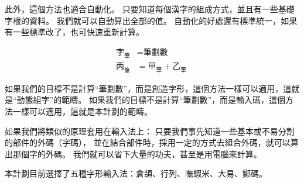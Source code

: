 \documentclass{article}
\newcommand\qhchar[1]{\mbox{#1}}
\newcommand\qhstroke[1]{\qhchar{#1}_{\mbox{筆}}}
\begin{document}
此外，這個方法也適合自動化。
只要知道每個漢字的組成方式，並且有一些基礎字根的資料。
我們就可以自動算出全部的值。
自動化的好處還有標準統一，如果有一些標準改了，也可快速重新計算。

\begin{subequations}
  \begin{align}
  \qhstroke{字} &= \text{筆劃數}\\
  \qhstroke{丙} &= \qhstroke{甲} + \qhstroke{乙}\
  \end{align}
\end{subequations}

如果我們的目標不是計算``筆劃數''，而是創造字形，這個方法一樣可以適用，這就是``動態組字''的範疇。
如果我們的目標不是計算``筆劃數''，而是輸入碼，這個方法一樣可以適用，這就是本計劃的範疇。

如果我們將類似的原理套用在輸入法上：
只要我們事先知道一些基本或不易分割的部件的外碼（字碼），
並在結合部件時，採用一定的方式去組合外碼，就可以算出那個字的外碼。
我們就可以省下大量的功夫，甚至是用電腦來計算。

本計劃目前選擇了五種字形輸入法：倉頡、行列、嘸蝦米、大易、鄭碼。
\end{document}
